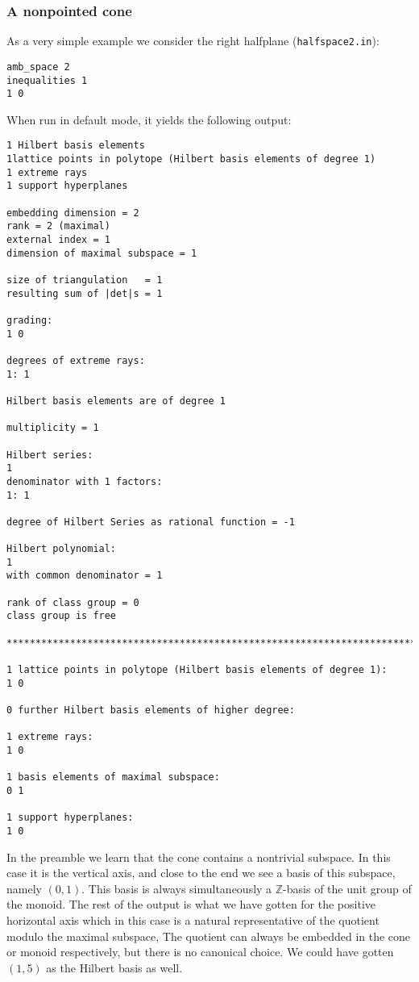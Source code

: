 \documentclass[12pt,a4paper]{scrartcl}
\theoremstyle{definition}
\def\ZZ{{\mathbb Z}}
\begin{document}
{\subsubsection{A nonpointed cone}

As a very simple example we consider the right halfplane (\verb|halfspace2.in|):
\begin{Verbatim}
amb_space 2
inequalities 1 
1 0
\end{Verbatim}
When run in default mode, it yields the following output:
\begin{Verbatim}
1 Hilbert basis elements
1lattice points in polytope (Hilbert basis elements of degree 1)
1 extreme rays
1 support hyperplanes

embedding dimension = 2
rank = 2 (maximal)
external index = 1
dimension of maximal subspace = 1

size of triangulation   = 1
resulting sum of |det|s = 1

grading:
1 0 

degrees of extreme rays:
1: 1  

Hilbert basis elements are of degree 1

multiplicity = 1

Hilbert series:
1 
denominator with 1 factors:
1: 1  

degree of Hilbert Series as rational function = -1

Hilbert polynomial:
1 
with common denominator = 1

rank of class group = 0
class group is free

***********************************************************************

1 lattice points in polytope (Hilbert basis elements of degree 1):
1 0

0 further Hilbert basis elements of higher degree:

1 extreme rays:
1 0

1 basis elements of maximal subspace:
0 1

1 support hyperplanes:
1 0
\end{Verbatim}

In the preamble we learn that the cone contains a nontrivial subspace. In this case it is the vertical axis, and close to the end we see a basis of this subspace, namely $(0,1)$. This basis is always simultaneously a $\ZZ$-basis of the unit group of the monoid. The rest of the output is what we have gotten for the positive horizontal axis which in this case is a natural representative of the quotient modulo the maximal subspace, The quotient can always be embedded in the cone or monoid respectively, but there is no canonical choice. We could have gotten $(1,5)$ as the Hilbert basis as well.

}
\end{document}
